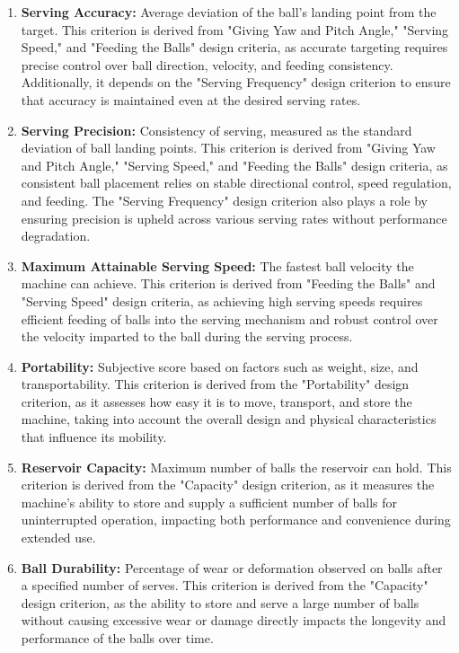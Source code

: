 \documentclass[12pt]{report}
\begin{document}
\begin{enumerate}
    \item \textbf{Serving Accuracy:} Average deviation of the ball's landing point from the target. This criterion is derived from "Giving Yaw and Pitch Angle," "Serving Speed," and "Feeding the Balls" design criteria, as accurate targeting requires precise control over ball direction, velocity, and feeding consistency. Additionally, it depends on the "Serving Frequency" design criterion to ensure that accuracy is maintained even at the desired serving rates.  


    \item \textbf{Serving Precision:} Consistency of serving, measured as the standard deviation of ball landing points. This criterion is derived from "Giving Yaw and Pitch Angle," "Serving Speed," and "Feeding the Balls" design criteria, as consistent ball placement relies on stable directional control, speed regulation, and feeding. The "Serving Frequency" design criterion also plays a role by ensuring precision is upheld across various serving rates without performance degradation.


    \item \textbf{Maximum Attainable Serving Speed:} The fastest ball velocity the machine can achieve. This criterion is derived from "Feeding the Balls" and "Serving Speed" design criteria, as achieving high serving speeds requires efficient feeding of balls into the serving mechanism and robust control over the velocity imparted to the ball during the serving process.


    \item \textbf{Portability:} Subjective score based on factors such as weight, size, and transportability. This criterion is derived from the "Portability" design criterion, as it assesses how easy it is to move, transport, and store the machine, taking into account the overall design and physical characteristics that influence its mobility.

    \item \textbf{Reservoir Capacity:} Maximum number of balls the reservoir can hold. This criterion is derived from the "Capacity" design criterion, as it measures the machine's ability to store and supply a sufficient number of balls for uninterrupted operation, impacting both performance and convenience during extended use.

    \item \textbf{Ball Durability:} Percentage of wear or deformation observed on balls after a specified number of serves. This criterion is derived from the "Capacity" design criterion, as the ability to store and serve a large number of balls without causing excessive wear or damage directly impacts the longevity and performance of the balls over time.


\end{enumerate}
\end{document}
